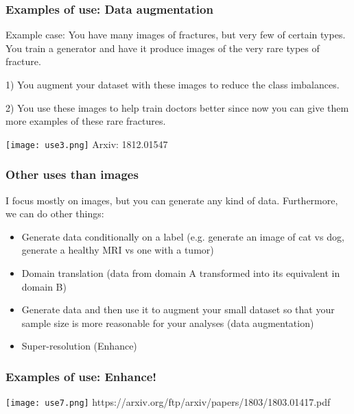 \documentclass[t]{beamer}
\begin{document}

\begin{frame}
\frametitle{Examples of use: Data augmentation}

Example case: You have many images of fractures, but very few of certain types. You train a generator and have it produce images of the very rare types of fracture. 

1) You augment your dataset with these images to reduce the class imbalances. 

2) You use these images to help train doctors better since now you can give them more examples of these rare fractures.

\texttt{[image: use3.png]}
Arxiv: 1812.01547

\end{frame}


\begin{frame}
\frametitle{Other uses than images}

I focus mostly on images, but you can generate any kind of data.
Furthermore, we can do other things:

\begin{itemize}
	\item Generate data conditionally on a label (e.g. generate an image of cat vs dog, generate a healthy MRI vs one with a tumor)
	
	\item Domain translation (data from domain A transformed into its equivalent in domain B)
	
	\item Generate data and then use it to augment your small dataset so that your sample size is more reasonable for your analyses (data augmentation)
	
	\item Super-resolution (Enhance)
\end{itemize}
\end{frame}


\begin{frame}
\frametitle{Examples of use: Enhance!}

\centering
\texttt{[image: use7.png]}
https://arxiv.org/ftp/arxiv/papers/1803/1803.01417.pdf

\end{frame}
\end{document}
